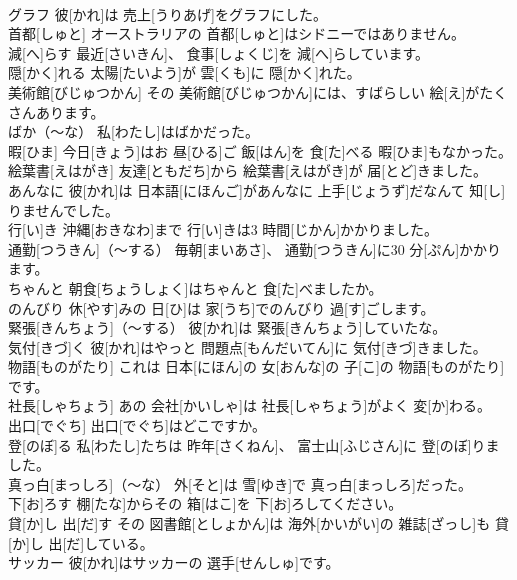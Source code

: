\documentclass[8pt]{extreport}
\begin{document}
\begin{CJK}{UTF8}{min}
\\	グラフ	彼[かれ]は 売上[うりあげ]をグラフにした。		
\\	首都[しゅと]	オーストラリアの 首都[しゅと]はシドニーではありません。		
\\	減[へ]らす	最近[さいきん]、 食事[しょくじ]を 減[へ]らしています。		
\\	隠[かく]れる	太陽[たいよう]が 雲[くも]に 隠[かく]れた。		
\\	美術館[びじゅつかん]	その 美術館[びじゅつかん]には、すばらしい 絵[え]がたくさんあります。		
\\	ばか（～な）	私[わたし]はばかだった。		
\\	暇[ひま]	今日[きょう]はお 昼[ひる]ご 飯[はん]を 食[た]べる 暇[ひま]もなかった。		
\\	絵葉書[えはがき]	友達[ともだち]から 絵葉書[えはがき]が 届[とど]きました。		
\\	あんなに	彼[かれ]は 日本語[にほんご]があんなに 上手[じょうず]だなんて 知[し]りませんでした。		
\\	行[い]き	沖縄[おきなわ]まで 行[い]きは3 時間[じかん]かかりました。		
\\	通勤[つうきん]（～する）	毎朝[まいあさ]、 通勤[つうきん]に30 分[ぷん]かかります。		
\\	ちゃんと	朝食[ちょうしょく]はちゃんと 食[た]べましたか。		
\\	のんびり	休[やす]みの 日[ひ]は 家[うち]でのんびり 過[す]ごします。		
\\	緊張[きんちょう]（～する）	彼[かれ]は 緊張[きんちょう]していたな。		
\\	気付[きづ]く	彼[かれ]はやっと 問題点[もんだいてん]に 気付[きづ]きました。		
\\	物語[ものがたり]	これは 日本[にほん]の 女[おんな]の 子[こ]の 物語[ものがたり]です。		
\\	社長[しゃちょう]	あの 会社[かいしゃ]は 社長[しゃちょう]がよく 変[か]わる。		
\\	出口[でぐち]	出口[でぐち]はどこですか。		
\\	登[のぼ]る	私[わたし]たちは 昨年[さくねん]、 富士山[ふじさん]に 登[のぼ]りました。		
\\	真っ白[まっしろ]（～な）	外[そと]は 雪[ゆき]で 真っ白[まっしろ]だった。		
\\	下[お]ろす	棚[たな]からその 箱[はこ]を 下[お]ろしてください。		
\\	貸[か]し 出[だ]す	その 図書館[としょかん]は 海外[かいがい]の 雑誌[ざっし]も 貸[か]し 出[だ]している。		
\\	サッカー	彼[かれ]はサッカーの 選手[せんしゅ]です。		

\end{CJK}
\end{document}

